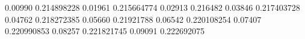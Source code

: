 0.00990 0.214898228
0.01961 0.215664774
0.02913 0.216482
0.03846 0.217403728
0.04762 0.218272385
0.05660 0.21921788
0.06542 0.220108254
0.07407 0.220990853
0.08257 0.221821745
0.09091 0.222692075
